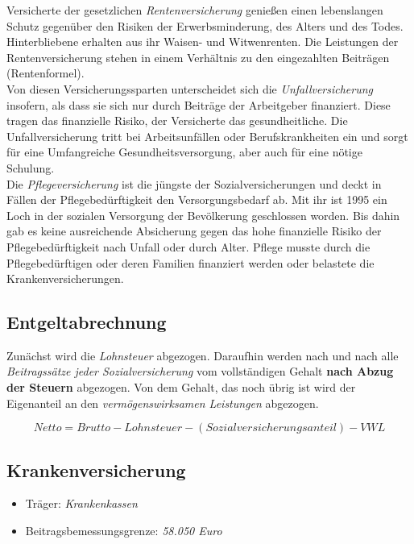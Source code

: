 \documentclass[a4paper, 12pt]{report}
\begin{document}
Versicherte der gesetzlichen \emph{Rentenversicherung} genießen einen
lebenslangen Schutz gegenüber den Risiken der Erwerbsminderung, des Alters und
des Todes. Hinterbliebene erhalten aus ihr Waisen- und Witwenrenten. Die
Leistungen der Rentenversicherung stehen in einem Verhältnis zu den eingezahlten
Beiträgen (Rentenformel). \\

Von diesen Versicherungssparten unterscheidet sich die \emph{Unfallversicherung}
insofern, als dass sie sich nur durch Beiträge der Arbeitgeber finanziert. Diese
tragen das finanzielle Risiko, der Versicherte das gesundheitliche. Die
Unfallversicherung tritt bei Arbeitsunfällen oder Berufskrankheiten ein und
sorgt für eine Umfangreiche Gesundheitsversorgung, aber auch für eine nötige
Schulung. \\

Die \emph{Pflegeversicherung} ist die jüngste der Sozialversicherungen und deckt
in Fällen der Pflegebedürftigkeit den Versorgungsbedarf ab. Mit ihr ist 1995 ein
Loch in der sozialen Versorgung der Bevölkerung geschlossen worden. Bis dahin
gab es keine ausreichende Absicherung gegen das hohe finanzielle Risiko der
Pflegebedürftigkeit nach Unfall oder durch Alter. Pflege musste durch die
Pflegebedürftigen oder deren Familien finanziert werden oder belastete die
Krankenversicherungen.

\subsection{Entgeltabrechnung}

Zunächst wird die \emph{Lohnsteuer} abgezogen. Daraufhin werden nach und nach
alle \emph{Beitragssätze jeder Sozialversicherung} vom vollständigen
Gehalt \textbf{nach Abzug der Steuern} abgezogen. Von dem Gehalt, das noch übrig
ist wird der Eigenanteil an den \emph{vermögenswirksamen Leistungen} abgezogen.


\begin{center}
    \begin{equation}
	Netto = Brutto - Lohnsteuer - (Sozialversicherungsanteil) - VWL
    \end{equation}
\end{center}

\subsection{Krankenversicherung}

\begin{itemize}
    \item Träger: \emph{Krankenkassen}
    \item Beitragsbemessungsgrenze: \emph{58.050 Euro}
\end{itemize}
\end{document}
